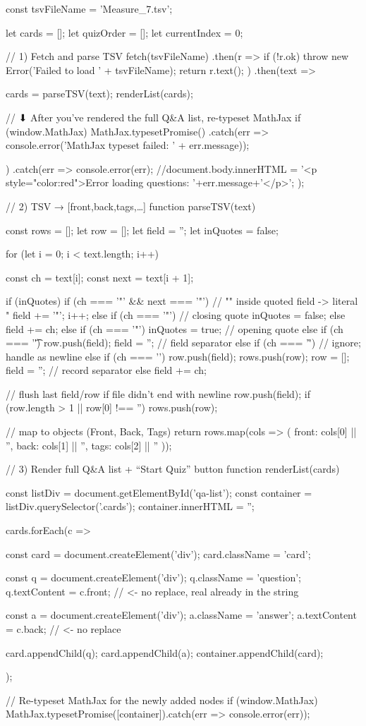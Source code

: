\documentclass{tstextbook}
\begin{document}
    const tsvFileName = 'Measure_7.tsv';

    let cards = [];
    let quizOrder = [];
    let currentIndex = 0;

    // 1) Fetch and parse TSV
fetch(tsvFileName)
  .then(r => {
    if (!r.ok) throw new Error('Failed to load ' + tsvFileName);
    return r.text();
  })
  .then(text => {
    cards = parseTSV(text);
    renderList(cards);

    // ⬇ After you’ve rendered the full Q&A list, re-typeset MathJax
    if (window.MathJax) {
      MathJax.typesetPromise()
        .catch(err => console.error('MathJax typeset failed: ' + err.message));
    }
  })
  .catch(err => {
    console.error(err);
    //document.body.innerHTML =  '<p style="color:red">Error loading questions: '+err.message+'</p>';
  });

    // 2) TSV → [{front,back,tags},…]
    function parseTSV(text) {
  const rows = [];
  let row = [];
  let field = '';
  let inQuotes = false;

  for (let i = 0; i < text.length; i++) {
    const ch = text[i];
    const next = text[i + 1];

    if (inQuotes) {
      if (ch === '"' && next === '"') {
        // "" inside quoted field -> literal "
        field += '"';
        i++;
      } else if (ch === '"') {
        // closing quote
        inQuotes = false;
      } else {
        field += ch;
      }
    } else {
      if (ch === '"') {
        inQuotes = true;                // opening quote
      } else if (ch === '\t') {
        row.push(field); field = '';    // field separator
      } else if (ch === '\r') {
        // ignore; handle \n as newline
      } else if (ch === '\n') {
        row.push(field); rows.push(row);
        row = []; field = '';           // record separator
      } else {
        field += ch;
      }
    }
  }
  // flush last field/row if file didn't end with newline
  row.push(field);
  if (row.length > 1 || row[0] !== '') rows.push(row);

  // map to objects (Front, Back, Tags)
  return rows.map(cols => ({
    front: cols[0] || '',
    back:  cols[1] || '',
    tags:  cols[2] || ''
  }));
}
// 3) Render full Q&A list + “Start Quiz” button
function renderList(cards) {
  const listDiv = document.getElementById('qa-list');
  const container = listDiv.querySelector('.cards');
  container.innerHTML = '';

  cards.forEach(c => {
    const card = document.createElement('div');
    card.className = 'card';

    const q = document.createElement('div');
    q.className = 'question';
    q.textContent = c.front;   // <- no replace, real \n already in the string

    const a = document.createElement('div');
    a.className = 'answer';
    a.textContent = c.back;    // <- no replace

    card.appendChild(q);
    card.appendChild(a);
    container.appendChild(card);
  });

  // Re-typeset MathJax for the newly added nodes
  if (window.MathJax) {
    MathJax.typesetPromise([container]).catch(err => console.error(err));
  }
}
\end{document}

